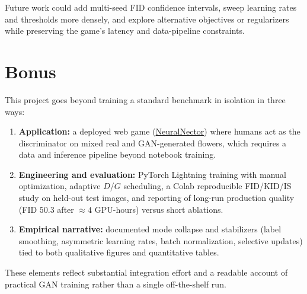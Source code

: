 \documentclass{article}
\theoremstyle{plain}
\theoremstyle{definition}
\theoremstyle{remark}
\begin{document}
Future work could add multi-seed FID confidence intervals, sweep learning rates and thresholds more densely, and explore alternative objectives or regularizers while preserving the game's latency and data-pipeline constraints.

\section{Bonus}
\label{sec:bonus}

This project goes beyond training a standard benchmark in isolation in three ways: 

\begin{enumerate}
\item \textbf{Application:} a deployed web game (\href{https://neuralnector.com}{NeuralNector}) where humans act as the discriminator on mixed real and GAN-generated flowers, which requires a data and inference pipeline beyond notebook training.
\item \textbf{Engineering and evaluation:} PyTorch Lightning training with manual optimization, adaptive $D$/$G$ scheduling, a Colab reproducible FID/KID/IS study on held-out test images, and reporting of long-run production quality (FID $50.3$ after $\approx 4$ GPU-hours) versus short ablations.
\item \textbf{Empirical narrative:} documented mode collapse and stabilizers (label smoothing, asymmetric learning rates, batch normalization, selective updates) tied to both qualitative figures and quantitative tables.
\end{enumerate}

These elements reflect substantial integration effort and a readable account of practical GAN training rather than a single off-the-shelf run.



\end{document}
